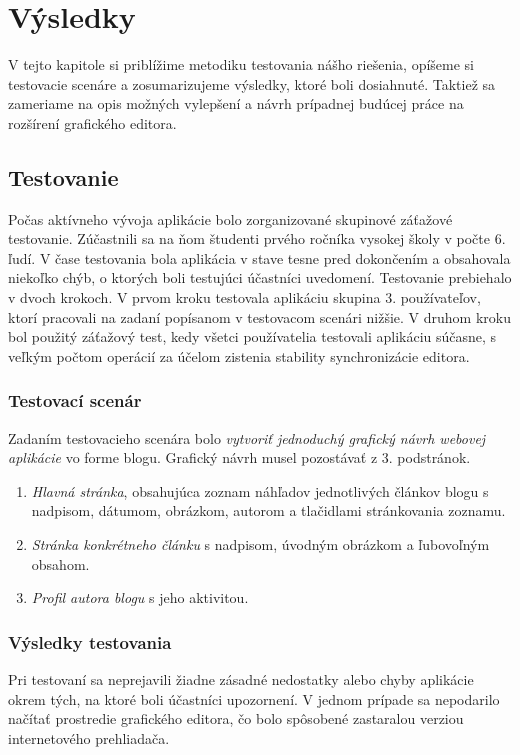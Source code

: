 \chapter{Výsledky}\label{chap:results}
V tejto kapitole si priblížime metodiku testovania nášho riešenia, opíšeme si testovacie scenáre a zosumarizujeme výsledky, ktoré boli dosiahnuté. Taktiež sa zameriame na opis možných vylepšení a návrh prípadnej budúcej práce na rozšírení grafického editora. 

\section{Testovanie}
Počas aktívneho vývoja aplikácie bolo zorganizované skupinové záťažové testovanie. Zúčastnili sa na ňom študenti prvého ročníka vysokej školy v počte 6. ľudí. V čase testovania bola aplikácia v stave tesne pred dokončením a obsahovala niekoľko chýb, o ktorých boli testujúci účastníci uvedomení. Testovanie prebiehalo v dvoch krokoch. V prvom kroku testovala aplikáciu skupina 3. používateľov, ktorí pracovali na zadaní popísanom v testovacom scenári nižšie. V druhom kroku bol použitý záťažový test, kedy všetci používatelia testovali aplikáciu súčasne, s veľkým počtom operácií za účelom zistenia stability synchronizácie editora.

\subsection{Testovací scenár}
Zadaním testovacieho scenára bolo \textit{vytvoriť jednoduchý grafický návrh webovej aplikácie} vo forme blogu. Grafický návrh musel pozostávať z 3. podstránok.
\begin{enumerate}
	\item \textit{Hlavná stránka}, obsahujúca zoznam náhľadov jednotlivých článkov blogu s nadpisom, dátumom, obrázkom, autorom a tlačidlami stránkovania zoznamu.
	\item \textit{Stránka konkrétneho článku} s nadpisom, úvodným obrázkom a ľubovoľným obsahom.
	\item \textit{Profil autora blogu} s jeho aktivitou.
\end{enumerate}

\subsection{Výsledky testovania}
Pri testovaní sa neprejavili žiadne zásadné nedostatky alebo chyby aplikácie okrem tých, na ktoré boli účastníci upozornení. V jednom prípade sa nepodarilo načítať prostredie grafického editora, čo bolo spôsobené zastaralou verziou internetového prehliadača. 

